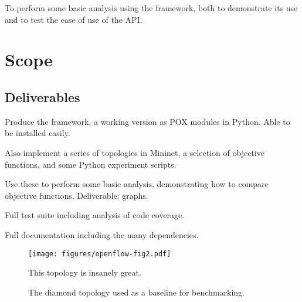 To perform some basic analysis using the framework, both to demonstrate its use and to test the ease of use of the API.

\section{Scope}

\subsection{Deliverables}

Produce the framework, a working version as POX modules in Python. Able to be installed easily.

Also implement a series of topologies in Mininet, a selection of objective functions, and some Python experiment scripts.

Use these to perform some basic analysis, demonstrating how to compare objective functions. Deliverable: graphs.

Full test suite including analysis of code coverage.

Full documentation including the many dependencies.

\begin{figure}
    \begin{center}
        \texttt{[image: figures/openflow-fig2.pdf]}
        \caption{The diamond topology used as a baseline for benchmarking.} This topology is insanely great.
    \end{center}
\end{figure}
